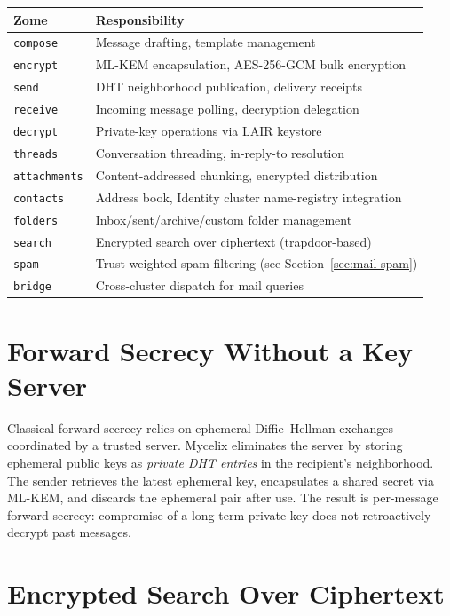 \documentclass[12pt]{book}
\begin{document}
\begin{longtable}{lp{8cm}}
\toprule
\textbf{Zome} & \textbf{Responsibility} \\
\midrule
\endhead
\texttt{compose}       & Message drafting, template management \\
\texttt{encrypt}       & ML-KEM encapsulation, AES-256-GCM bulk encryption \\
\texttt{send}          & DHT neighborhood publication, delivery receipts \\
\texttt{receive}       & Incoming message polling, decryption delegation \\
\texttt{decrypt}       & Private-key operations via LAIR keystore \\
\texttt{threads}       & Conversation threading, in-reply-to resolution \\
\texttt{attachments}   & Content-addressed chunking, encrypted distribution \\
\texttt{contacts}      & Address book, Identity cluster name-registry integration \\
\texttt{folders}       & Inbox/sent/archive/custom folder management \\
\texttt{search}        & Encrypted search over ciphertext (trapdoor-based) \\
\texttt{spam}          & Trust-weighted spam filtering (see Section~\ref{sec:mail-spam}) \\
\texttt{bridge}        & Cross-cluster dispatch for mail queries \\
\bottomrule
\end{longtable}

\section{Forward Secrecy Without a Key Server}

Classical forward secrecy relies on ephemeral Diffie--Hellman exchanges
coordinated by a trusted server.  Mycelix eliminates the server by storing
ephemeral public keys as \emph{private DHT entries} in the recipient's
neighborhood.  The sender retrieves the latest ephemeral key, encapsulates
a shared secret via ML-KEM, and discards the ephemeral pair after use.  The
result is per-message forward secrecy: compromise of a long-term private key
does not retroactively decrypt past messages.

\section{Encrypted Search Over Ciphertext}
\end{document}
